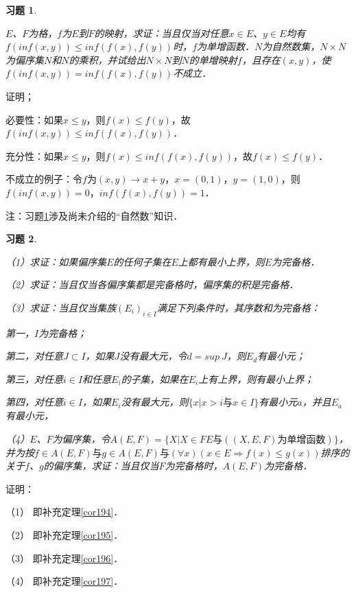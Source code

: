 \documentclass[12pt, a4paper, oneside]{book}
\newtheorem{exer}{习题}
\begin{document}
			\begin{exer}\label{exer86}
				\hfill\par
				$E$、$F$为格，$f$为$E$到$F$的映射，求证：当且仅当对任意$x\in E$、$y\in E$均有$f(inf(x, y))\leq inf(f(x), f(y))$时，$f$为单增函数．$N$为自然数集，$N\times N$为偏序集$N$和$N$的乘积，并试给出$N\times N$到$N$的单增映射$f$，且存在$(x, y)$，使$f(inf(x, y))=inf(f(x), f(y))$不成立．
			\end{exer}
			证明；
			\par
			必要性：如果$x\leq y$，则$f(x)\leq f(y)$，故$f(inf(x, y))\leq inf(f(x), f(y))$．
			\par
			充分性：如果$x\leq y$，则$f(x)\leq inf(f(x), f(y))$，故$f(x)\leq f(y)$．
			\par
			不成立的例子：令$f$为$(x, y)\to x+y$，$x=(0, 1)$，$y=(1, 0)$，则$f(inf(x, y))=0$，$inf(f(x), f(y))=1$．
			\par
			注：习题\ref{exer86}涉及尚未介绍的“自然数”知识．
			
			\begin{exer}\label{exer87}
				\hfill\par
				（1）求证：如果偏序集$E$的任何子集在$E$上都有最小上界，则$E$为完备格．
				\par
				（2）求证：当且仅当各偏序集都是完备格时，偏序集的积是完备格．
				\par
				（3）求证：当且仅当集族$(E_i)_{i\in I}$满足下列条件时，其序数和为完备格：
				\par
				第一，$I$为完备格；
				\par
				第二，对任意$J\subset I$，如果$J$没有最大元，令$d=sup\ J$，则$E_d$有最小元；
				\par
				第三，对任意$i\in I$和任意$E_i$的子集，如果在$E_i$上有上界，则有最小上界；
				\par
				第四，对任意$i\in I$，如果$E_i$没有最大元，则$\{x|x>i\text{与}x\in I\}$有最小元$a$，并且$E_a$有最小元，
				\par
				（4）$E$、$F$为偏序集，令$A(E, F)=\{X|X\in FE\text{与}((X, E, F)\text{为单增函数})\}$，并为按$f\in A(E, F)\text{与}g\in A(E, F)\text{与}(\forall x)(x\in E\Rightarrow f(x)\leq g(x))$排序的关于$f$、$g$的偏序集，求证：当且仅当$F$为完备格时，$A(E, F)$为完备格．
			\end{exer}
			证明：
			\par
			（1）	即补充定理\ref{cor194}．
			\par
			（2）	即补充定理\ref{cor195}．
			\par
			（3）	即补充定理\ref{cor196}．
			\par
			（4）	即补充定理\ref{cor197}．
			
\end{document}
